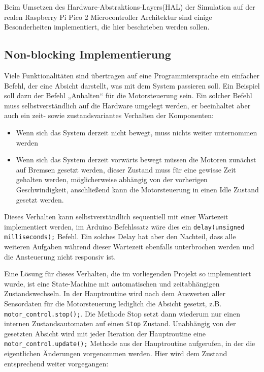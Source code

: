 \documentclass[
  a4paper,
  12pt,
  DIV=12,        %
  parskip=half,  %
  headings=small %
]{scrartcl}
\theoremstyle{definition}
\theoremstyle{definition}
\begin{document}
Beim Umsetzen des Hardware-Abstraktions-Layers(HAL) der Simulation auf der realen Raspberry Pi Pico 2 Microcontroller Architektur sind einige Besonderheiten implementiert, die hier beschrieben werden sollen.


\subsection{Non-blocking Implementierung}

Viele Funktionalitäten sind übertragen auf eine Programmiersprache ein einfacher Befehl, der eine Absicht darstellt, was mit dem System passieren soll. Ein Beispiel soll dazu der Befehl „Anhalten“ für die Motorsteuerung sein. Ein solcher Befehl muss selbstverständlich auf die Hardware umgelegt werden, er beeinhaltet aber auch ein zeit- sowie zustandsvariantes Verhalten der Komponenten:

\begin{itemize}
	\item Wenn sich das System derzeit nicht bewegt, muss nichts weiter unternommen werden
	\item Wenn sich das System derzeit vorwärts bewegt müssen die Motoren zunächst auf Bremsen gesetzt werden, dieser Zustand muss für eine gewisse Zeit gehalten werden, möglicherweise abhängig von der vorherigen Geschwindigkeit, anschließend kann die Motorsteuerung in einen Idle Zustand gesetzt werden.
\end{itemize}

Dieses Verhalten kann selbstverständlich sequentiell mit einer Wartezeit implementiert werden, im Arduino Befehlssatz wäre dies ein \texttt{delay(unsigned milliseconds);} Befehl. Ein solches Delay hat aber den Nachteil, dass alle weiteren Aufgaben während dieser Wartezeit ebenfalls unterbrochen werden und die Ansteuerung nicht responsiv ist.

Eine Lösung für dieses Verhalten, die im vorliegenden Projekt so implementiert wurde, ist eine State-Machine mit automatischen und zeitabhängigen Zustandswechseln. In der Hauptroutine wird nach dem Auswerten aller Sensordaten für die Motorsteuerung lediglich die Absicht gesetzt, z.B. \texttt{motor\_control.stop();}. Die Methode Stop setzt dann wiederum nur einen internen Zustandsautomaten auf einen \texttt{Stop} Zustand. Unabhängig von der gesetzten Absicht wird mit jeder Iteration der Hauptroutine eine \texttt{motor\_control.update();} Methode aus der Hauptroutine aufgerufen, in der die eigentlichen Änderungen vorgenommen werden. Hier wird dem Zustand entsprechend weiter vorgegangen:
\end{document}

